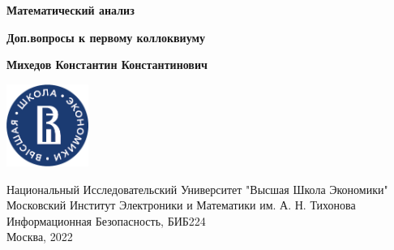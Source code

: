 \documentclass[a4paper,12pt]{article}
\begin{document}
    \begin{titlepage}
      \begin{center}
        \vspace*{1.5cm}
  
        \Huge
        \textbf{Математический анализ}
  
        \vspace{0.5cm} \large
        \textbf{Доп.вопросы к первому коллоквиуму}
  
        \vspace{1.5cm} \normalsize
        \textbf{Михедов Константин Константинович}
  
        \vfill
  
        \includegraphics[width=0.2\textwidth]{hse_logo}
  
        \vspace{1cm} \footnotesize
        Национальный Исследовательский Университет "Высшая Школа Экономики" \\
        Московский Институт Электроники и Математики им. А. Н. Тихонова \\
        Информационная Безопасность, БИБ224 \\
        Москва, 2022
      \end{center}
    \end{titlepage}
\end{document}
